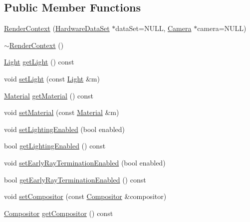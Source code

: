 \subsection*{\-Public \-Member \-Functions}
\begin{DoxyCompactItemize}
\item 
\hyperlink{class_verdi_1_1_render_context_a872285d5096b45c4747fe900b7aff0f8}{\-Render\-Context} (\hyperlink{class_verdi_1_1_hardware_data_set}{\-Hardware\-Data\-Set} $\ast$data\-Set=\-N\-U\-L\-L, \hyperlink{class_verdi_1_1_camera}{\-Camera} $\ast$camera=\-N\-U\-L\-L)
\item 
\hyperlink{class_verdi_1_1_render_context_a903382a9ac3a49276c5b095157422354}{$\sim$\-Render\-Context} ()
\item 
\hyperlink{class_verdi_1_1_light}{\-Light} \hyperlink{class_verdi_1_1_render_context_a737ff845664e998a4d769afefba62462}{get\-Light} () const 
\item 
void \hyperlink{class_verdi_1_1_render_context_a9471c76500f63355d71bb30c96813150}{set\-Light} (const \hyperlink{class_verdi_1_1_light}{\-Light} \&m)
\item 
\hyperlink{class_verdi_1_1_material}{\-Material} \hyperlink{class_verdi_1_1_render_context_a6e079408d1d02905ee55a0d4c70e0f79}{get\-Material} () const 
\item 
void \hyperlink{class_verdi_1_1_render_context_a8f8f5efb828947b1ecb8b34a0b6ceeea}{set\-Material} (const \hyperlink{class_verdi_1_1_material}{\-Material} \&m)
\item 
void \hyperlink{class_verdi_1_1_render_context_a8bf4f79e3aa8ecc8c04ad6ae935a3030}{set\-Lighting\-Enabled} (bool enabled)
\item 
bool \hyperlink{class_verdi_1_1_render_context_aee7f8d02cdc092fb5b8702960825fa3c}{get\-Lighting\-Enabled} () const 
\item 
void \hyperlink{class_verdi_1_1_render_context_a988a7e59f871cf8aa08db301fe2855e5}{set\-Early\-Ray\-Termination\-Enabled} (bool enabled)
\item 
bool \hyperlink{class_verdi_1_1_render_context_a6a39da47ac05aef6eeee5c793bd4a9e6}{get\-Early\-Ray\-Termination\-Enabled} () const 
\item 
void \hyperlink{class_verdi_1_1_render_context_a6fe6226c139d9934da858634912284aa}{set\-Compositor} (const \hyperlink{class_verdi_1_1_compositor}{\-Compositor} \&compositor)
\item 
\hyperlink{class_verdi_1_1_compositor}{\-Compositor} \hyperlink{class_verdi_1_1_render_context_a51445423cc67a8c6d0ad6e5ab3e28cf4}{get\-Compositor} () const 

\end{DoxyCompactItemize}
